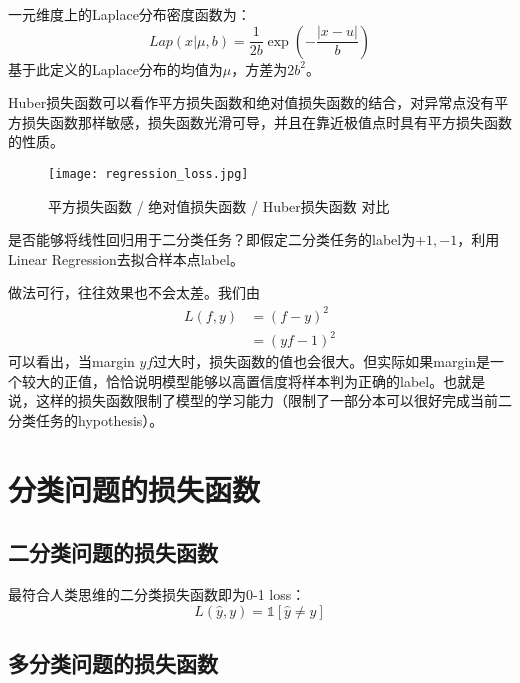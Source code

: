 \begin{definition}[Laplace分布] \label{def:laplace} 
  一元维度上的Laplace分布密度函数为：
  \begin{equation}
    Lap(x|\mu, b) = \frac{1}{2b}\exp\left(-\frac{|x-u|}{b}\right)
  \end{equation}
  基于此定义的Laplace分布的均值为$\mu$，方差为$2b^2$。
\end{definition}

Huber损失函数可以看作平方损失函数和绝对值损失函数的结合，对异常点没有平方损失函数那样敏感，损失函数光滑可导，并且在靠近极值点时具有平方损失函数的性质。

\begin{figure}[htbp]
  \centering
  \texttt{[image: regression\_loss.jpg]}
  \caption{平方损失函数 / 绝对值损失函数 / Huber损失函数 对比 \label{fig:regression_loss}}
\end{figure}

\begin{exercise}\label{exer:binary_loss}
  是否能够将线性回归用于二分类任务？即假定二分类任务的label为${+1,-1}$，利用Linear Regression去拟合样本点label。  
\end{exercise}
\begin{solution}
  做法可行，往往效果也不会太差。我们由
  \begin{align}
    L(f, y) &= (f-y)^2 \\
            &= (yf - 1)^2
  \end{align}
  可以看出，当margin $yf$过大时，损失函数的值也会很大。但实际如果margin是一个较大的正值，恰恰说明模型能够以高置信度将样本判为正确的label。也就是说，这样的损失函数限制了模型的学习能力（限制了一部分本可以很好完成当前二分类任务的hypothesis）。
\end{solution}



\section{分类问题的损失函数}

\subsection{二分类问题的损失函数}

最符合人类思维的二分类损失函数即为0-1 loss：
\begin{equation}
  L(\hat{y}, y) = \mathds{1}\left[\hat{y} \neq y\right]
\end{equation}

\subsection{多分类问题的损失函数}

